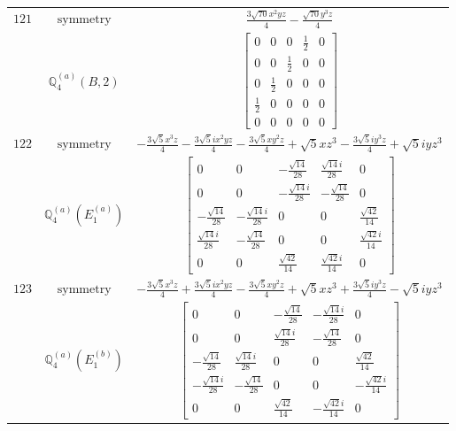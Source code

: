 \documentclass[fleqn,8pt,landscape]{jsarticle}
\begin{document}
\begin{longtable}{ccc}
$ 121 $ & $ \text{symmetry} $ & $ \frac{3 \sqrt{70} x^{2} y z}{4} - \frac{\sqrt{70} y^{3} z}{4} $ \\
$  $ & $ \mathbb{Q}_{4}^{(a)}(B,2) $ & $ \begin{bmatrix} 0 & 0 & 0 & \frac{1}{2} & 0 \\ 0 & 0 & \frac{1}{2} & 0 & 0 \\ 0 & \frac{1}{2} & 0 & 0 & 0 \\ \frac{1}{2} & 0 & 0 & 0 & 0 \\ 0 & 0 & 0 & 0 & 0 \end{bmatrix} $ \\ \hline
$ 122 $ & $ \text{symmetry} $ & $ - \frac{3 \sqrt{5} x^{3} z}{4} - \frac{3 \sqrt{5} i x^{2} y z}{4} - \frac{3 \sqrt{5} x y^{2} z}{4} + \sqrt{5} x z^{3} - \frac{3 \sqrt{5} i y^{3} z}{4} + \sqrt{5} i y z^{3} $ \\
$  $ & $ \mathbb{Q}_{4}^{(a)}(E_{1}^{(a)}) $ & $ \begin{bmatrix} 0 & 0 & - \frac{\sqrt{14}}{28} & \frac{\sqrt{14} i}{28} & 0 \\ 0 & 0 & - \frac{\sqrt{14} i}{28} & - \frac{\sqrt{14}}{28} & 0 \\ - \frac{\sqrt{14}}{28} & - \frac{\sqrt{14} i}{28} & 0 & 0 & \frac{\sqrt{42}}{14} \\ \frac{\sqrt{14} i}{28} & - \frac{\sqrt{14}}{28} & 0 & 0 & \frac{\sqrt{42} i}{14} \\ 0 & 0 & \frac{\sqrt{42}}{14} & \frac{\sqrt{42} i}{14} & 0 \end{bmatrix} $ \\ \hline
$ 123 $ & $ \text{symmetry} $ & $ - \frac{3 \sqrt{5} x^{3} z}{4} + \frac{3 \sqrt{5} i x^{2} y z}{4} - \frac{3 \sqrt{5} x y^{2} z}{4} + \sqrt{5} x z^{3} + \frac{3 \sqrt{5} i y^{3} z}{4} - \sqrt{5} i y z^{3} $ \\
$  $ & $ \mathbb{Q}_{4}^{(a)}(E_{1}^{(b)}) $ & $ \begin{bmatrix} 0 & 0 & - \frac{\sqrt{14}}{28} & - \frac{\sqrt{14} i}{28} & 0 \\ 0 & 0 & \frac{\sqrt{14} i}{28} & - \frac{\sqrt{14}}{28} & 0 \\ - \frac{\sqrt{14}}{28} & \frac{\sqrt{14} i}{28} & 0 & 0 & \frac{\sqrt{42}}{14} \\ - \frac{\sqrt{14} i}{28} & - \frac{\sqrt{14}}{28} & 0 & 0 & - \frac{\sqrt{42} i}{14} \\ 0 & 0 & \frac{\sqrt{42}}{14} & - \frac{\sqrt{42} i}{14} & 0 \end{bmatrix} $ \\ \hline

\end{longtable}
\end{document}
